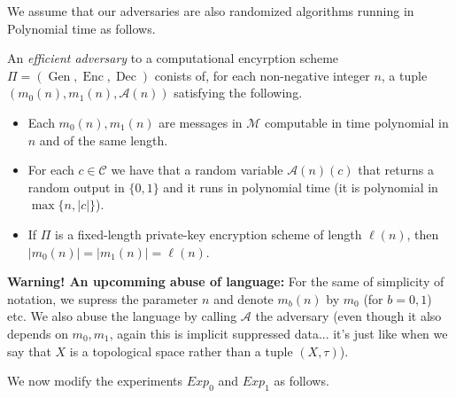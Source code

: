 \documentclass[twoside, a4paper, 10pt]{amsart}
\begin{document}
We assume that our adversaries are also randomized algorithms running in Polynomial time as follows.

\begin{mydef} An \textit{efficient adversary} to a computational encyrption scheme  $\Pi = (\operatorname{Gen}, \operatorname{Enc}, \operatorname{Dec})$ conists of, for each non-negative integer $n$, a tuple $(m_0(n), m_1(n), \mathcal{A}(n))$ satisfying the following.

\begin{itemize}
	\item Each $m_0(n),m_1(n)$ are messages in $\mathcal{M}$ computable in time polynomial in $n$ and of the same length.
	\item For each $c \in \mathcal{C}$ we have that a random variable $\mathcal{A}(n)(c)$ that returns a random output in $\{0,1\}$ and it runs in polynomial time (it is polynomial in $\max\{n, |c|\}$).
	\item If $\Pi$ is a fixed-length private-key encryption scheme of length $\ell(n)$, then $|m_0(n)|=|m_1(n)| = \ell(n)$.
\end{itemize}

\end{mydef}

\textbf{Warning! An upcomming abuse of language:} For the same of simplicity of notation, we supress the parameter $n$ and denote $m_b(n)$ by $m_0$ (for $b=0,1$) etc. We also abuse the language by calling $\mathcal{A}$ the adversary (even though it also depends on $m_0,m_1$, again this is implicit suppressed data... it's just like when we say that $X$ is a topological space rather than a tuple $(X,\tau)$).

We now modify the experiments $Exp_0$ and $Exp_1$ as follows.
\end{document}
